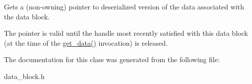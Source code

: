 Gets a (non-\/owning) pointer to deserialized version of the data associated with the data block. 

The pointer is valid until the handle most recently satisfied with this data block (at the time of the \hyperlink{classdarma__runtime_1_1abstract_1_1backend_1_1_data_block_af184a4868855e95a5db5b7e05b945773}{get\+\_\+data()} invocation) is released. 

The documentation for this class was generated from the following file\+:\begin{DoxyCompactItemize}
\item 
data\+\_\+block.\+h\end{DoxyCompactItemize}
